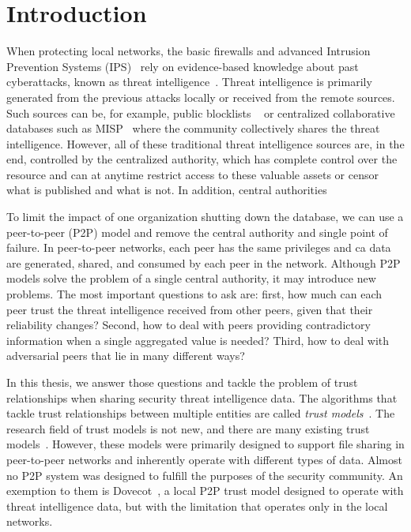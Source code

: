 \chapter{Introduction}
\label{ch:introduction}



When protecting local networks, the basic firewalls and advanced Intrusion Prevention Systems (IPS)~\cite{zhang2004intrusion} rely on evidence-based knowledge about past cyberattacks, known as threat intelligence~\cite{threatintelligence}. Threat intelligence is primarily generated from the previous attacks locally or received from the remote sources.
Such sources can be, for example, public blocklists ~\cite{abuseipdb, dataplane, binarydefense} or centralized collaborative databases such as MISP~\cite{wagner2016misp} where the community collectively shares the threat intelligence.
However, all of these traditional threat intelligence sources are, in the end, controlled by the centralized authority, which has complete control over the resource and can at anytime restrict access to these valuable assets or censor what is published and what is not.
In addition, central authorities 

To limit the impact of one organization shutting down the database, we can use a peer-to-peer (P2P) model and remove the central authority and single point of failure.
In peer-to-peer networks, each peer has the same privileges and ca data are generated, shared, and consumed by each peer in the network.
Although P2P models solve the problem of a single central authority, it may introduce new problems. The most important questions to ask are: first, how much can each peer trust the threat intelligence received from other peers, given that their reliability changes? Second, how to deal with peers providing contradictory information when a single aggregated value is needed? Third, how to deal with adversarial peers that lie in many different ways?

In this thesis, we answer those questions and tackle the problem of trust relationships when sharing security threat intelligence data.
The algorithms that tackle trust relationships between multiple entities are called \textit{trust models}~\cite{wang2003trust}.
The research field of trust models is not new, and there are many existing trust models~\cite{abera2019sadan, sort, christensen2014hybrid, 1562680, huynh2006integrated, kamvar2003eigentrust, li2014design, pinyol2013computational, xiong2004peertrust}.
However, these models were primarily designed to support file sharing in peer-to-peer networks and inherently operate with different types of data. Almost no P2P system was designed to fulfill the purposes of the security community.
An exemption to them is Dovecot~\cite{dita}, a local P2P trust model designed to operate with threat intelligence data, but with the limitation that operates only in the local networks.

